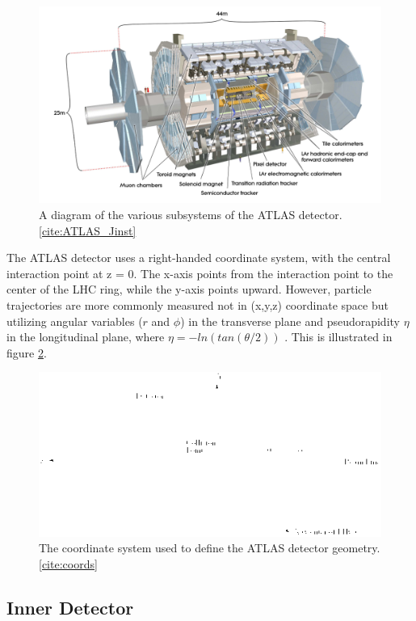 \begin{figure}
  \includegraphics[width=\linewidth]{figures/detector_chapter/ATLAS.png}
  \caption{A diagram of the various subsystems of the ATLAS detector. \ref{cite:ATLAS_Jinst}}
  \label{fig:ATLAS}
\end{figure}

	The ATLAS detector uses a right-handed coordinate system, with the central interaction point at z = 0. The x-axis points from the interaction point to the center of the LHC ring, while the y-axis points upward. However, particle trajectories are more commonly measured not in (x,y,z) coordinate space but utilizing angular variables ($r$ and $\phi$) in the transverse plane and pseudorapidity $ \eta $ in the longitudinal plane, where $ \eta = -ln(tan( \theta /2) ) $ . This is illustrated in figure \ref{fig:coords}.

\begin{figure}
  \includegraphics[width=\linewidth]{figures/detector_chapter/coords.png}
  \caption{The coordinate system used to define the ATLAS detector geometry. \ref{cite:coords}}
  \label{fig:coords}
\end{figure}

\subsection{Inner Detector} \label{sec:ID} 

